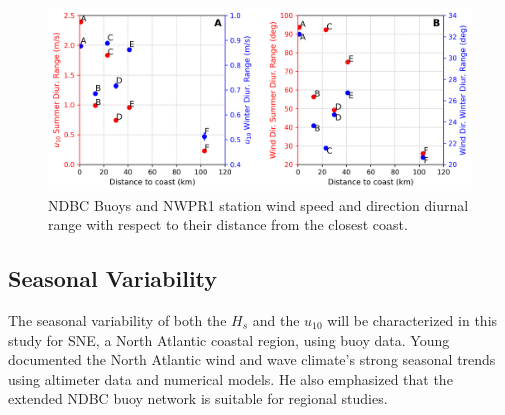\begin{figure}[H]
\centering
\includegraphics[width=0.95\linewidth]{Figures/Chapter5/wind_diurnal_range1.png}
\caption{NDBC Buoys and NWPR1 station wind speed and direction diurnal range with respect to their distance from the closest coast.}
\label{fig:wind_diurnal_range}
\end{figure}

\pagebreak

\subsection{Seasonal Variability}\label{seasonal_variability}

The seasonal variability of both the $H_{s}$ and the $u_{10}$ will be characterized in this study for SNE, a North Atlantic coastal region, using buoy data. Young \cite{ Young1999c} documented the North Atlantic wind and wave climate's strong seasonal trends using altimeter data and numerical models. He also emphasized that the extended NDBC buoy network is suitable for regional studies. 


